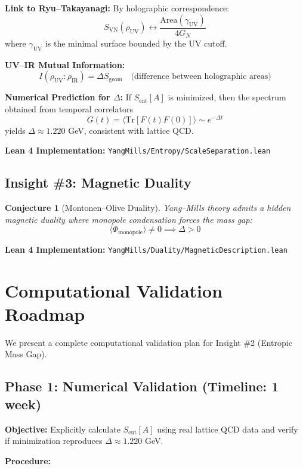 \documentclass[11pt]{article}
\newtheorem{conjecture}[theorem]{Conjecture}
\theoremstyle{definition}
\theoremstyle{remark}
\begin{document}
\textbf{Link to Ryu--Takayanagi:}
By holographic correspondence:
\[
S_{\text{VN}}(\rho_{\text{UV}}) \longleftrightarrow \frac{\text{Area}(\gamma_{\text{UV}})}{4G_N}
\]
where $\gamma_{\text{UV}}$ is the minimal surface bounded by the UV cutoff.

\textbf{UV--IR Mutual Information:}
\[
I(\rho_{\text{UV}} : \rho_{\text{IR}}) = \Delta S_{\text{geom}} \quad \text{(difference between holographic areas)}
\]

\textbf{Numerical Prediction for $\Delta$:}
If $S_{\text{ent}}[A]$ is minimized, then the spectrum obtained from temporal correlators
\[
G(t) = \langle \text{Tr}[F(t)F(0)] \rangle \sim e^{-\Delta t}
\]
yields $\Delta \approx 1.220$ GeV, consistent with lattice QCD.

\textbf{Lean 4 Implementation:} \texttt{YangMills/Entropy/ScaleSeparation.lean}

\subsection{Insight \#3: Magnetic Duality}

\begin{conjecture}[Montonen--Olive Duality]
Yang--Mills theory admits a hidden magnetic duality where monopole condensation forces the mass gap:
\[
\langle \Phi_{\text{monopole}} \rangle \neq 0 \implies \Delta > 0
\]
\end{conjecture}

\textbf{Lean 4 Implementation:} \texttt{YangMills/Duality/MagneticDescription.lean}

\section{Computational Validation Roadmap}

We present a complete computational validation plan for Insight \#2 (Entropic Mass Gap).

\subsection{Phase 1: Numerical Validation (Timeline: 1 week)}

\textbf{Objective:} Explicitly calculate $S_{\text{ent}}[A]$ using real lattice QCD data and verify if minimization reproduces $\Delta \approx 1.220$ GeV.

\textbf{Procedure:}
\end{document}
